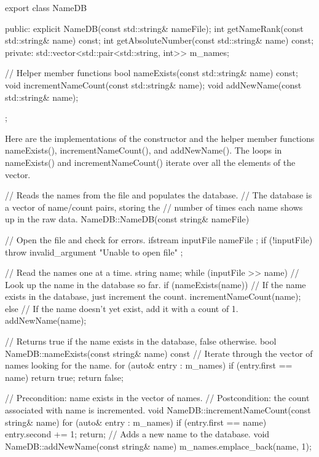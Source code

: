 \begin{cpp}
export class NameDB
{
    public:
        explicit NameDB(const std::string& nameFile);
        int getNameRank(const std::string& name) const;
        int getAbsoluteNumber(const std::string& name) const;
    private:
        std::vector<std::pair<std::string, int>> m_names;

        // Helper member functions
        bool nameExists(const std::string& name) const;
        void incrementNameCount(const std::string& name);
        void addNewName(const std::string& name);
};
\end{cpp}

Here are the implementations of the constructor and the helper member functions nameExists(), incrementNameCount(), and addNewName(). The loops in nameExists() and incrementNameCount() iterate over all the elements of the vector.

\begin{cpp}
// Reads the names from the file and populates the database.
// The database is a vector of name/count pairs, storing the
// number of times each name shows up in the raw data.
NameDB::NameDB(const string& nameFile)
{
    // Open the file and check for errors.
    ifstream inputFile { nameFile };
    if (!inputFile) {
        throw invalid_argument { "Unable to open file" };
    }

    // Read the names one at a time.
    string name;
    while (inputFile >> name) {
        // Look up the name in the database so far.
        if (nameExists(name)) {
            // If the name exists in the database, just increment the count.
            incrementNameCount(name);
        } else {
            // If the name doesn't yet exist, add it with a count of 1.
            addNewName(name);
        }
    }
}

// Returns true if the name exists in the database, false otherwise.
bool NameDB::nameExists(const string& name) const
{
    // Iterate through the vector of names looking for the name.
    for (auto& entry : m_names) {
        if (entry.first == name) {
            return true;
        }
    }
    return false;
}

// Precondition: name exists in the vector of names.
// Postcondition: the count associated with name is incremented.
void NameDB::incrementNameCount(const string& name)
{
    for (auto& entry : m_names) {
        if (entry.first == name) {
            entry.second += 1;
            return;
        }
    }
}
// Adds a new name to the database.
void NameDB::addNewName(const string& name)
{
    m_names.emplace_back(name, 1);
}
\end{cpp}

